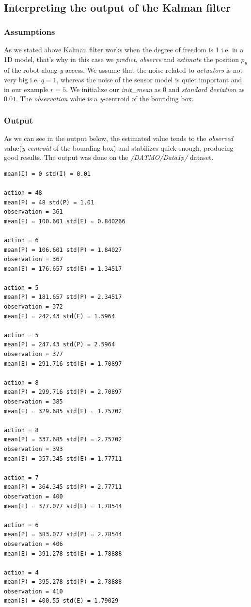 \documentclass{article}
\begin{document}
\subsection{Interpreting the output of the Kalman filter}
\subsubsection{Assumptions}
As we stated above Kalman filter works when the degree of freedom is 1 i.e. in a 1D model, that's why in this case we \textit{predict}, \textit{observe} and \textit{estimate} the position $p_y$ of the robot along \textit{y}-access. We assume that the noise related to \textit{actuators} is not very big i.e. $q = 1$, whereas the noise of the sensor model is quiet important and in our example $r = 5$. We initialize our \textit{init\_mean} as $0$ and \textit{standard deviation} as $0.01$. The \textit{observation} value is a \textit{y}-centroid of the bounding box.

\subsubsection{Output}
As we can see in the output below, the estimated value tends to the \textit{observed} value(\textit{y centroid} of the bounding box) and stabilizes quick enough, producing good results. The output was done on the \textit{/DATMO/Data1p/} dataset.

\begin{lstlisting}
mean(I) = 0 std(I) = 0.01

action = 48
mean(P) = 48 std(P) = 1.01
observation = 361
mean(E) = 100.601 std(E) = 0.840266

action = 6
mean(P) = 106.601 std(P) = 1.84027
observation = 367
mean(E) = 176.657 std(E) = 1.34517

action = 5
mean(P) = 181.657 std(P) = 2.34517
observation = 372
mean(E) = 242.43 std(E) = 1.5964

action = 5
mean(P) = 247.43 std(P) = 2.5964
observation = 377
mean(E) = 291.716 std(E) = 1.70897

action = 8
mean(P) = 299.716 std(P) = 2.70897
observation = 385
mean(E) = 329.685 std(E) = 1.75702

action = 8
mean(P) = 337.685 std(P) = 2.75702
observation = 393
mean(E) = 357.345 std(E) = 1.77711

action = 7
mean(P) = 364.345 std(P) = 2.77711
observation = 400
mean(E) = 377.077 std(E) = 1.78544

action = 6
mean(P) = 383.077 std(P) = 2.78544
observation = 406
mean(E) = 391.278 std(E) = 1.78888

action = 4
mean(P) = 395.278 std(P) = 2.78888
observation = 410
mean(E) = 400.55 std(E) = 1.79029
\end{lstlisting}
\end{document}
